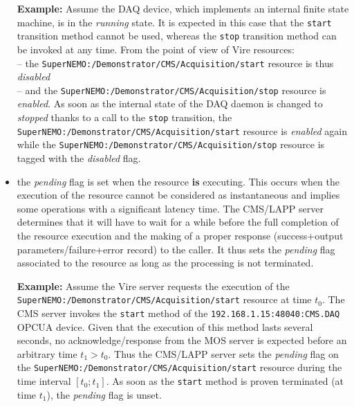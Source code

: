\begin{itemize}
\noindent\textbf{Example:} Assume the DAQ  device, which implements an
internal finite state machine, is  in the \emph{running} state.  It is
expected in this case that the \texttt{start} transition method cannot
be used, whereas the \texttt{stop} transition method can be invoked at
any  time.   From the  point  of  view  of  Vire resources:\\  --  the
\verb|SuperNEMO:/Demonstrator/CMS/Acquisition/start| resource is thus
\emph{disabled}           \\            --           and           the
\verb|SuperNEMO:/Demonstrator/CMS/Acquisition/stop|    resource    is
\emph{enabled}.  As  soon as the internal  state of the DAQ  daemon is
changed  to  \emph{stopped} thanks  to  a  call to  the  \texttt{stop}
transition,  the \verb|SuperNEMO:/Demonstrator/CMS/Acquisition/start|
resource       is      \emph{enabled}       again      while       the
\verb|SuperNEMO:/Demonstrator/CMS/Acquisition/stop|    resource    is
tagged with the \emph{disabled} flag.

\item the  \emph{pending} flag  is set  when the  resource \textbf{is}
  executing.  This occurs when the execution of the resource cannot be
  considered  as  instantaneous and  implies  some  operations with  a
  significant latency  time.  The  CMS/LAPP server determines  that it
  will have  to wait  for a  while before the  full completion  of the
  resource   execution   and  the   making   of   a  proper   response
  (success+output parameters/failure+error record)  to the caller.  It
  thus sets the \emph{pending} flag associated to the resource as long
  as the processing is not terminated.

\noindent\textbf{Example:}  Assume   the  Vire  server   requests  the
execution                            of                            the
\\  \verb|SuperNEMO:/Demonstrator/CMS/Acquisition/start| resource  at
time $t_0$.  The  CMS server invokes the \texttt{start}  method of the
\texttt{192.168.1.15:48040:CMS.DAQ}  OPCUA  device.   Given  that  the
execution    of    this    method   lasts    several    seconds,    no
acknowledge/response  from  the  MOS  server  is  expected  before  an
arbitrary  time   $t_1>t_0$.   Thus  the  CMS/LAPP   server  sets  the
\emph{pending}                flag               on                the
\verb|SuperNEMO:/Demonstrator/CMS/Acquisition/start|  resource during
the time interval  $[t_0;t_1]$.  As soon as  the \texttt{start} method
is  proven terminated  (at  time $t_1$),  the  \emph{pending} flag  is
unset.


\end{itemize}
